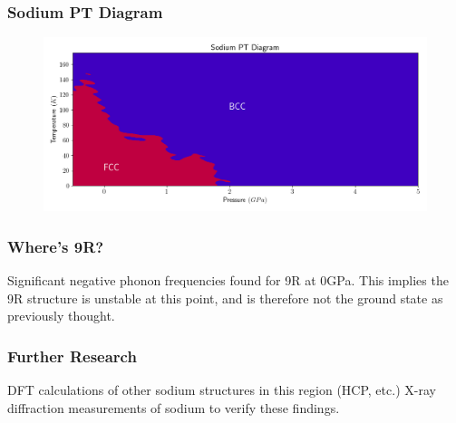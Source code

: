 \documentclass{beamer}
\begin{document}
\begin{frame}
	\frametitle{Sodium PT Diagram}
	\begin{figure}[ht]
	\begin{center}
		\includegraphics[height=2in]{sodium_pt_diagram.png}
	\end{center}
	\end{figure}
\end{frame}

\begin{frame}
	\frametitle{Where's 9R?}
	Significant negative phonon frequencies found for 9R at 0GPa.
	\newline
	\newline
	This implies the 9R structure is unstable at this point, and is therefore not the ground state as previously thought.
\end{frame}

\begin{frame}
	\frametitle{Further Research}
	DFT calculations of other sodium structures in this region (HCP, etc.)
	\newline
	\newline
	X-ray diffraction measurements of sodium to verify these findings.
\end{frame}
\end{document}
